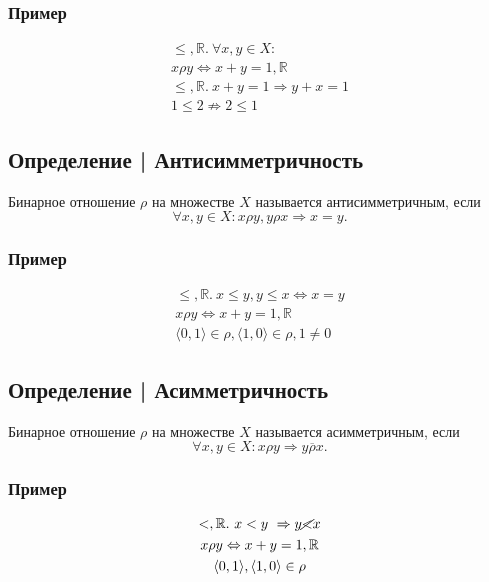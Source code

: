 \documentclass{article}
\begin{document}
\subsubsection{Пример}
\begin{gather*}
    \le, \mathbb{R}. ~ \forall x, y \in X: \\
    x \rho y \Leftrightarrow x + y = 1, \mathbb{R} \\
    \le, \mathbb{R}. ~ x + y = 1 \Rightarrow y + x = 1 \\
    1 \le 2 \nRightarrow 2 \le 1
\end{gather*}


\subsection{Определение | Антисимметричность}
Бинарное отношение $\rho$ на множестве $X$ называется антисимметричным, если 
\[
    \forall x, y \in X: x \rho y, y \rho x \Rightarrow x = y.
\]

\subsubsection{Пример}
\begin{gather*}
    \le, \mathbb{R}. ~ x \le y, y \le x \Leftrightarrow x = y \\
    x \rho y \Leftrightarrow x + y = 1, \mathbb{R} \\
    \langle 0, 1 \rangle \in \rho, \langle 1, 0 \rangle \in \rho, 1 \neq 0
\end{gather*}


\subsection{Определение | Асимметричность}
Бинарное отношение $\rho$ на множестве $X$ называется асимметричным, если
\[
    \forall x, y \in X: x \rho y \Rightarrow y \overline{\rho} x.
\]

\subsubsection{Пример}
\begin{gather*}
    <, \mathbb{R}. ~ x < y ~\Rightarrow y \cancel{<} x \\
    x \rho y \Leftrightarrow x + y = 1, \mathbb{R} \\
    \langle 0, 1 \rangle, \langle 1, 0 \rangle \in \rho
\end{gather*}
\end{document}
